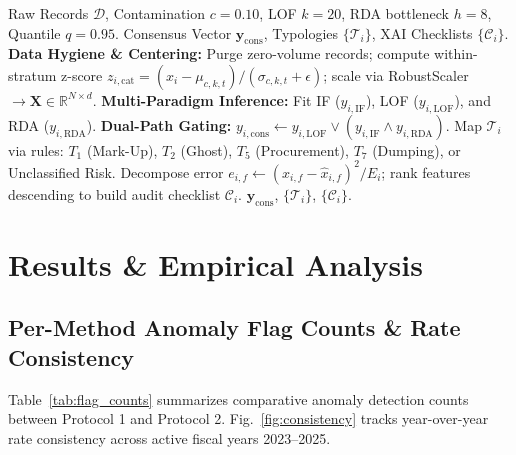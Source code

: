 \documentclass[conference]{IEEEtran}
\begin{document}
\begin{algorithm}[htbp]
\caption{End-to-End Dual-Path Anomaly Detection \& XAI Pipeline}
\label{alg:end_to_end}
\begin{algorithmic}[1]
\REQUIRE Raw Records $\mathcal{D}$, Contamination $c=0.10$, LOF $k=20$, RDA bottleneck $h=8$, Quantile $q=0.95$.
\ENSURE Consensus Vector $\mathbf{y}_{\text{cons}}$, Typologies $\{\mathcal{T}_i\}$, XAI Checklists $\{\mathcal{C}_i\}$.
\STATE \textbf{Data Hygiene \& Centering:} Purge zero-volume records; compute within-stratum z-score $z_{i, \text{cat}} = (x_i - \mu_{c,k,t})/(\sigma_{c,k,t}+\epsilon)$; scale via RobustScaler $\to \mathbf{X} \in \mathbb{R}^{N \times d}$.
\STATE \textbf{Multi-Paradigm Inference:} Fit IF ($y_{i,\text{IF}}$), LOF ($y_{i,\text{LOF}}$), and RDA ($y_{i,\text{RDA}}$).
\STATE \textbf{Dual-Path Gating:} $y_{i, \text{cons}} \leftarrow y_{i, \text{LOF}} \lor (y_{i, \text{IF}} \land y_{i, \text{RDA}})$.
    \STATE Map $\mathcal{T}_i$ via rules: $T_1$ (Mark-Up), $T_2$ (Ghost), $T_5$ (Procurement), $T_7$ (Dumping), or Unclassified Risk.
    \STATE Decompose error $e_{i,f} \leftarrow (x_{i,f} - \hat{x}_{i,f})^2 / E_i$; rank features descending to build audit checklist $\mathcal{C}_i$.
\ENDFOR
\RETURN $\mathbf{y}_{\text{cons}}$, $\{\mathcal{T}_i\}$, $\{\mathcal{C}_i\}$.
\end{algorithmic}
\end{algorithm}

\section{Results \& Empirical Analysis}

\subsection{Per-Method Anomaly Flag Counts \& Rate Consistency}

Table~\ref{tab:flag_counts} summarizes comparative anomaly detection counts between Protocol 1 and Protocol 2. Fig.~\ref{fig:consistency} tracks year-over-year rate consistency across active fiscal years 2023--2025.
\end{document}
